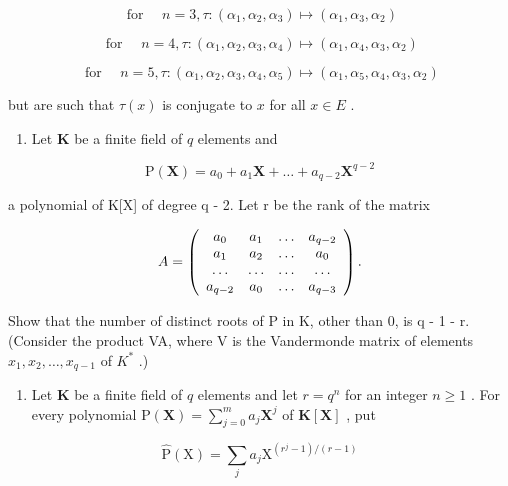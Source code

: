 \[
\text { for } \quad n = 3, \tau : (\alpha_ {1}, \alpha_ {2}, \alpha_ {3}) \mapsto (\alpha_ {1}, \alpha_ {3}, \alpha_ {2})
\]

\[
\text { for } \quad n = 4, \tau : (\alpha_ {1}, \alpha_ {2}, \alpha_ {3}, \alpha_ {4}) \mapsto (\alpha_ {1}, \alpha_ {4}, \alpha_ {3}, \alpha_ {2})
\]

\[
\text { for } \quad n = 5, \tau : (\alpha_ {1}, \alpha_ {2}, \alpha_ {3}, \alpha_ {4}, \alpha_ {5}) \mapsto (\alpha_ {1}, \alpha_ {5}, \alpha_ {4}, \alpha_ {3}, \alpha_ {2})
\]

but are such that \(\tau(x)\) is conjugate to \(x\) for all \(x \in E\) .

\begin{enumerate}
\def\labelenumi{\arabic{enumi})}
\setcounter{enumi}{7}
\tightlist
\item
  Let \(\mathbf{K}\) be a finite field of \(q\) elements and
\end{enumerate}

\[
\mathrm{P} (\mathbf {X}) = a _ {0} + a _ {1} \mathbf {X} + \dots + a _ {q - 2} \mathbf {X} ^ {q - 2}
\]

a polynomial of K{[}X{]} of degree q - 2. Let r be the rank of the matrix

\[
A = \left( \begin{array}{c c c c} a _ {0} & a _ {1} & \dots & a _ {q - 2} \\ a _ {1} & a _ {2} & \dots & a _ {0} \\ \dots & \dots & \dots & \dots \\ a _ {q - 2} & a _ {0} & \dots & a _ {q - 3} \end{array} \right).
\]

Show that the number of distinct roots of P in K, other than 0, is q - 1 - r. (Consider the product VA, where V is the Vandermonde matrix of elements \(x_{1}, x_{2}, \ldots, x_{q-1}\) of \(K^{*}\) .)

\begin{enumerate}
\def\labelenumi{\arabic{enumi})}
\setcounter{enumi}{8}
\tightlist
\item
  Let \(\mathbf{K}\) be a finite field of \(q\) elements and let \(r = q^n\) for an integer \(n \geqslant 1\) . For every polynomial \(\mathrm{P}(\mathbf{X}) = \sum_{j=0}^{m} a_j \mathbf{X}^j\) of \(\mathbf{K}[\mathbf{X}]\) , put
\end{enumerate}

\[
\hat {\mathrm{P}} (\mathrm{X}) = \sum_ {j} a _ {j} \mathrm{X} ^ {(r ^ {j} - 1) / (r - 1)}
\]

